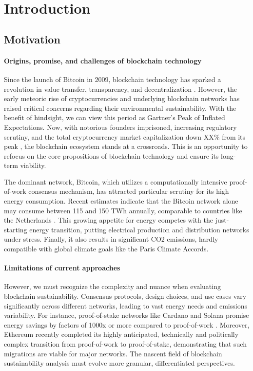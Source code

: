 \documentclass[11pt]{report}
\begin{document}
\printacronyms

\chapter{Introduction}

\section{Motivation}
\subsubsection*{Origins, promise, and challenges of blockchain technology}
Since the launch of Bitcoin in 2009, blockchain technology has sparked a revolution in value transfer, transparency, and decentralization \cite{nakamotoBitcoinPeertopeerElectronic2008}. However, the early meteoric rise of cryptocurrencies and underlying blockchain networks has raised critical concerns regarding their environmental sustainability. With the benefit of hindsight, we can view this period as Gartner's Peak of Inflated Expectations. Now, with notorious founders imprisoned, increasing regulatory scrutiny, and the total cryptocurrency market capitalization down
XX\% from its peak , the blockchain ecosystem stands at a crossroads. This is an opportunity to refocus on the core propositions of blockchain technology and ensure its long-term viability.


The dominant network, Bitcoin, which utilizes a computationally intensive proof-of-work consensus mechanism, has attracted particular scrutiny for its high energy consumption. Recent estimates indicate that the Bitcoin network alone may consume between 115 and 150 TWh annually, comparable to countries like the Netherlands \cite{devriesRevisitingBitcoinCarbon2022,neumuellerCambridgeBitcoinElectricity2021}. This growing appetite for energy competes with the just-starting energy transition, putting electrical production and distribution networks under stress. Finally, it also results in significant CO2 emissions, hardly compatible with global climate goals like the Paris Climate Accords.

\subsubsection*{Limitations of current approaches}
However, we must recognize the complexity and nuance when evaluating blockchain sustainability. Consensus protocols, design choices, and use cases vary significantly across different networks, leading to vast energy needs and emissions variability. For instance, proof-of-stake networks like Cardano and Solana promise energy savings by factors of 1000x or more compared to proof-of-work \cite{kohliAnalysisEnergyConsumption2023}. Moreover, Ethereum recently completed its highly anticipated, technically and politically complex transition from proof-of-work to proof-of-stake, demonstrating that such migrations are viable for major networks. \cite{bloombergnewsEthereumMergeYour2022} The nascent field of blockchain sustainability analysis must evolve more granular, differentiated perspectives.
\end{document}
